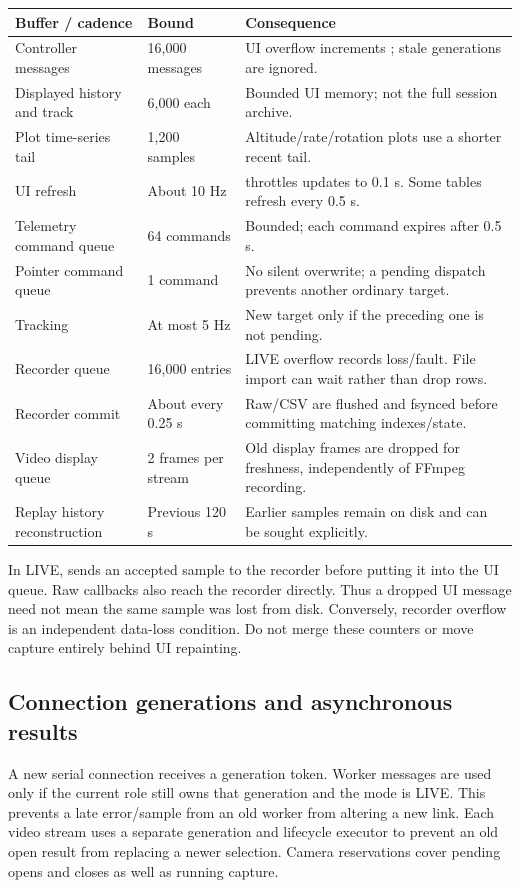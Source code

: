 \begin{longtable}{@{}L{.30\linewidth}L{.21\linewidth}L{.42\linewidth}@{}}
\toprule Buffer / cadence & Bound & Consequence \\\midrule\endhead
Controller messages & 16,000 messages & UI overflow increments ; stale generations are ignored. \\
Displayed history and track & 6,000 each & Bounded UI memory; not the full session archive. \\
Plot time-series tail & 1,200 samples & Altitude/rate/rotation plots use a shorter recent tail. \\
UI refresh & About 10 Hz &  throttles updates to 0.1 s. Some tables refresh every 0.5 s. \\
Telemetry command queue & 64 commands & Bounded; each command expires after 0.5 s. \\
Pointer command queue & 1 command & No silent overwrite; a pending dispatch prevents another ordinary target. \\
Tracking & At most 5 Hz & New target only if the preceding one is not pending. \\
Recorder queue & 16,000 entries & LIVE overflow records loss/fault. File import can wait rather than drop rows. \\
Recorder commit & About every 0.25 s & Raw/CSV are flushed and fsynced before committing matching indexes/state. \\
Video display queue & 2 frames per stream & Old display frames are dropped for freshness, independently of FFmpeg recording. \\
Replay history reconstruction & Previous 120 s & Earlier samples remain on disk and can be sought explicitly. \\
\bottomrule
\end{longtable}

In LIVE,  sends an accepted sample to the recorder
before putting it into the UI queue. Raw callbacks also reach the recorder
directly. Thus a dropped UI message need not mean the same sample was lost from
disk. Conversely, recorder overflow is an independent data-loss condition.
Do not merge these counters or move capture entirely behind UI repainting.

\subsection{Connection generations and asynchronous results}
A new serial connection receives a generation token. Worker messages are used
only if the current role still owns that generation and the mode is LIVE.
This prevents a late error/sample from an old worker from altering a new link.
Each video stream uses a separate generation and lifecycle executor to prevent
an old open result from replacing a newer selection. Camera reservations cover
pending opens and closes as well as running capture.

